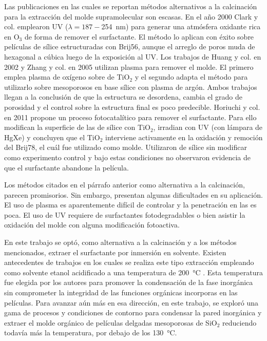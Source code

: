 	Las publicaciones en las cuales se reportan métodos alternativos a la calcinación para la extracción del molde supramolecular son escasas. En el año 2000 Clark y col.\cite{Clark2000} emplearon UV ($\lambda=187-$\SI{254}{\nm}) para generar una atmósfera oxidante rica en O$_3$ de forma de remover el surfactante. El método lo aplican con éxito sobre películas de sílice estructuradas con Brij56, aunque el arreglo de poros muda de hexagonal a cúbica luego de la exposición al UV. Los trabajos de Huang y col. en 2002\cite{Huang2002} y Zhang y col. en 2005\cite{Zhang2005} utilizan plasma para remover el molde. El primero emplea plasma de oxígeno sobre \pdm\space de TiO$_2$ y el segundo adapta el método para utilizarlo sobre mesoporosos en base sílice con plasma de argón. Ambos trabajos llegan a la conclusión de que la estructura se desordena, cambia el grado de porosidad y el control sobre la estructura final es poco predecible. Horiuchi y col.\cite{Horiuchi2011} en 2011 propone un proceso fotocatalítico para remover el surfactante. Para ello modifican la superficie de las \pdm\space de sílice con TiO$_2$, irradian con UV (con lámpara de HgXe) y concluyen que el TiO$_2$ interviene activamente en la oxidación y remoción del Brij78, el cuál fue utilizado como molde. Utilizaron \pdm\space de sílice sin modificar como experimento control y bajo estas condiciones no observaron evidencia de que el surfactante abandone la película.

	Los métodos citados en el párrafo anterior como alternativa a la calcinación, parecen promisorios. Sin embargo, presentan algunas dificultades en su aplicación. El uso de plasma es aparentemente difícil de controlar y la penetración en las \pdm\space es poca. El uso de UV requiere de surfactantes fotodegradables o bien asistir la oxidación del molde con alguna modificación fotoactiva.

	En este trabajo se optó, como alternativa a la calcinación y a los métodos mencionados, extraer el surfactante por inmersión en solvente. Existen antecedentes de trabajos en los cuales se realiza este tipo extracción empleando como solvente etanol acidificado a una temperatura de \SI{200}{\celsius} \cite{Angelome2008,Calvo20210,Calvo2010,Fuertes2009}. Esta temperatura fue elegida por los autores para promover la condensación de la fase inorgánica sin comprometer la integridad de las funciones orgánicas incorporas en las películas. Para avanzar aún más en esa dirección, en este trabajo, se exploró una gama de procesos y condiciones de contorno para condensar la pared inorgánica y extraer el molde orgánico de películas delgadas mesoporosas de SiO$_2$ reduciendo todavía más la temperatura, por debajo de los \SI{130}{\celsius}.

